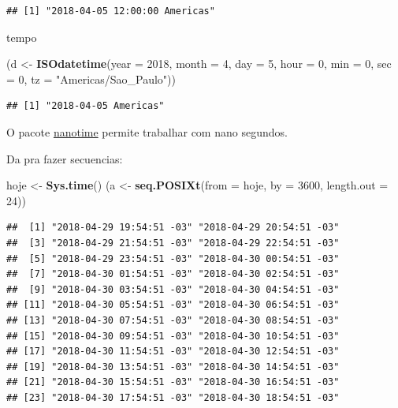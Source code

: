 \documentclass[]{book}
\newenvironment{Shaded}{\begin{snugshade}}{\end{snugshade}}
\newcommand{\KeywordTok}[1]{\textcolor[rgb]{0.13,0.29,0.53}{\textbf{#1}}}
\newcommand{\DataTypeTok}[1]{\textcolor[rgb]{0.13,0.29,0.53}{#1}}
\newcommand{\DecValTok}[1]{\textcolor[rgb]{0.00,0.00,0.81}{#1}}
\newcommand{\StringTok}[1]{\textcolor[rgb]{0.31,0.60,0.02}{#1}}
\newcommand{\NormalTok}[1]{#1}
\theoremstyle{definition}
\theoremstyle{definition}
\theoremstyle{definition}
\theoremstyle{remark}
\begin{document}
\begin{verbatim}
## [1] "2018-04-05 12:00:00 Americas"
\end{verbatim}

tempo

\begin{Shaded}
\begin{Highlighting}[]
\NormalTok{(d <-}\StringTok{ }\KeywordTok{ISOdatetime}\NormalTok{(}\DataTypeTok{year =} \DecValTok{2018}\NormalTok{, }\DataTypeTok{month =} \DecValTok{4}\NormalTok{, }\DataTypeTok{day =} \DecValTok{5}\NormalTok{, }\DataTypeTok{hour =} \DecValTok{0}\NormalTok{, }\DataTypeTok{min =} \DecValTok{0}\NormalTok{, }\DataTypeTok{sec =} \DecValTok{0}\NormalTok{,}
                  \DataTypeTok{tz =} \StringTok{"Americas/Sao_Paulo"}\NormalTok{))}
\end{Highlighting}
\end{Shaded}

\begin{verbatim}
## [1] "2018-04-05 Americas"
\end{verbatim}

O pacote \href{https://github.com/eddelbuettel/nanotime}{nanotime}
permite trabalhar com nano segundos.

Da pra fazer secuencias:

\begin{Shaded}
\begin{Highlighting}[]
\NormalTok{hoje <-}\StringTok{ }\KeywordTok{Sys.time}\NormalTok{()}
\NormalTok{(a <-}\StringTok{ }\KeywordTok{seq.POSIXt}\NormalTok{(}\DataTypeTok{from =}\NormalTok{ hoje, }\DataTypeTok{by =} \DecValTok{3600}\NormalTok{, }\DataTypeTok{length.out =} \DecValTok{24}\NormalTok{))}
\end{Highlighting}
\end{Shaded}

\begin{verbatim}
##  [1] "2018-04-29 19:54:51 -03" "2018-04-29 20:54:51 -03"
##  [3] "2018-04-29 21:54:51 -03" "2018-04-29 22:54:51 -03"
##  [5] "2018-04-29 23:54:51 -03" "2018-04-30 00:54:51 -03"
##  [7] "2018-04-30 01:54:51 -03" "2018-04-30 02:54:51 -03"
##  [9] "2018-04-30 03:54:51 -03" "2018-04-30 04:54:51 -03"
## [11] "2018-04-30 05:54:51 -03" "2018-04-30 06:54:51 -03"
## [13] "2018-04-30 07:54:51 -03" "2018-04-30 08:54:51 -03"
## [15] "2018-04-30 09:54:51 -03" "2018-04-30 10:54:51 -03"
## [17] "2018-04-30 11:54:51 -03" "2018-04-30 12:54:51 -03"
## [19] "2018-04-30 13:54:51 -03" "2018-04-30 14:54:51 -03"
## [21] "2018-04-30 15:54:51 -03" "2018-04-30 16:54:51 -03"
## [23] "2018-04-30 17:54:51 -03" "2018-04-30 18:54:51 -03"
\end{verbatim}
\end{document}
